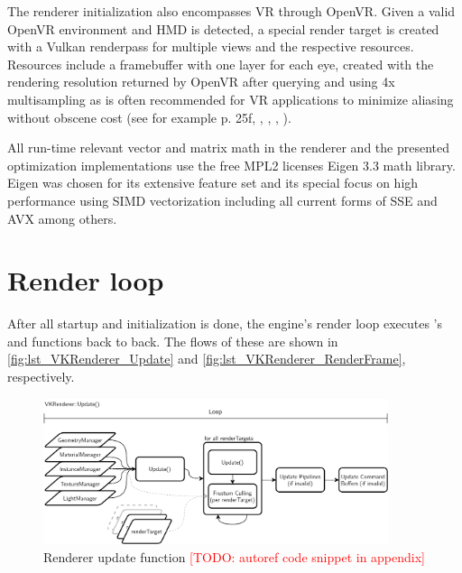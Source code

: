 The renderer initialization also encompasses \gls{VR} through \gls{OpenVR}. Given a valid \gls{OpenVR} environment and \gls{HMD} is detected, a special render target is created with a Vulkan renderpass for multiple views and the respective resources. Resources include a framebuffer with one layer for each eye, created with the rendering resolution returned by \gls{OpenVR} after querying  and using 4x multisampling as is often recommended for \gls{VR} applications to minimize aliasing without obscene cost (see for example \cite{Vlachos.2015} p. 25f, \cite{Porter.2017}, \cite{Carmack.2016}, \cite{VisCircleGmbH.2018}, \cite{Pettit.2017}). 

All run-time relevant vector and matrix math in the renderer and the presented optimization implementations use the free MPL2 licenses Eigen 3.3 math library. Eigen was chosen for its extensive feature set and its special focus on high performance using SIMD vectorization including all current forms of SSE and AVX among others\cite{Guennebaud.2010}.

\section{Render loop} 
After all startup and initialization is done, the engine's render loop executes 's  and  functions back to back. The flows of these are shown in \autoref{fig:lst_VKRenderer_Update} and \autoref{fig:lst_VKRenderer_RenderFrame}, respectively. 

\begin{figure}[htb]
  \centering
  \includegraphics[width=0.9\textwidth]{pictures/Tachyon_VKRenderer_Update}
  \caption[VKRenderer's Update]{Renderer update function \textcolor{red}{[TODO: autoref code snippet in appendix]}}\label{fig:lst_VKRenderer_Update}
\end{figure} 

